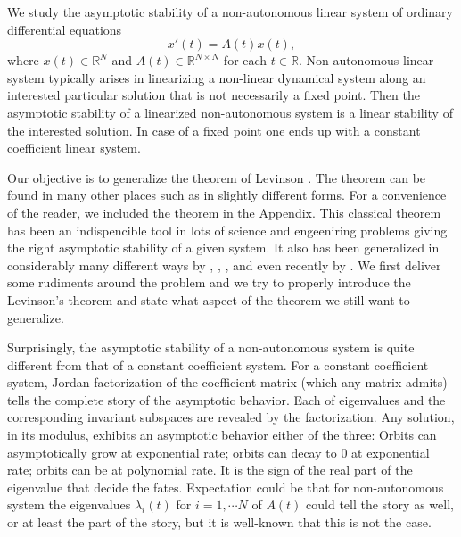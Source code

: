 \documentclass[a4paper,11pt]{article}
\theoremstyle{remark}
\begin{document}
We study the asymptotic stability of a non-autonomous linear system of ordinary differential equations
\begin{equation}
 x'(t) = A(t)x(t), \label{eq:0}
\end{equation}
where $x(t) \in \mathbb{R}^N$ and $A(t)\in \mathbb{R}^{N\times N}$ for each $t\in \mathbb{R}$.
Non-autonomous linear system typically arises in linearizing a non-linear dynamical system along an interested particular solution that is not necessarily a fixed point. Then the asymptotic stability of a linearized non-autonomous system is a linear stability of the interested solution. In case of a fixed point one ends up with a constant coefficient linear system.

Our objective is to generalize the theorem of Levinson \cite{L48}. The theorem can be found in many other places such as \cite{CL55} in slightly different forms. For a convenience of the reader, we included the theorem in the Appendix. %
This classical theorem has been an indispencible tool in lots of science and engeeniring problems giving the right asymptotic stability of a given system. It also has been generalized in considerably many different ways by \cite{HW55}, \cite{HL77}, \cite{HX94}, and even recently by \cite{BL07}. We first deliver some rudiments around the problem and we try to properly introduce the Levinson's theorem and state what aspect of the theorem we still want to generalize.





Surprisingly, the asymptotic stability of a non-autonomous system is quite different from that of a constant coefficient system. For a constant coefficient system, Jordan factorization of the coefficient matrix (which any matrix admits) tells the complete story of the asymptotic behavior. Each of eigenvalues and the corresponding invariant subspaces are revealed by the factorization. Any solution, in its modulus, exhibits an asymptotic behavior either of the three: Orbits can asymptotically grow at exponential rate; orbits can decay to $0$ at exponential rate; orbits can be at polynomial rate. It is the sign of the real part of the eigenvalue that decide the fates. Expectation could be that for non-autonomous system the eigenvalues $\lambda_i(t)$ for $i=1,\cdots N$ of $A(t)$ could tell the story as well, or at least the part of the story, but it is well-known that this is not the case. 
\end{document}
